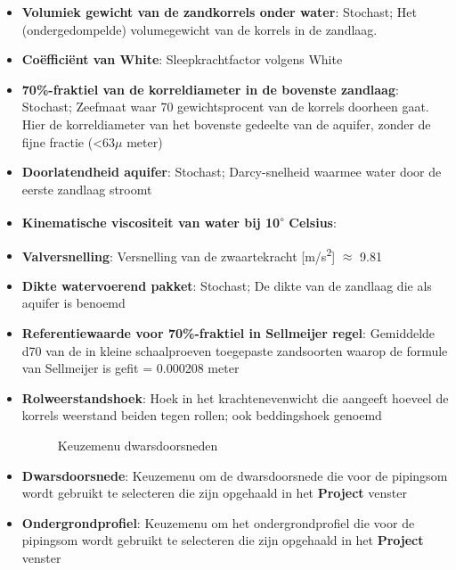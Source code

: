 \begin{enumerate}
\begin{itemize}
	\item \textbf{Volumiek gewicht van de zandkorrels onder water}: Stochast; Het (ondergedompelde) volumegewicht van de korrels in de zandlaag.
	\item \textbf{Co\"{e}ffici\"{e}nt van White}: Sleepkrachtfactor volgens White
	\item \textbf{70\%-fraktiel van de korreldiameter in de bovenste zandlaag}: Stochast; Zeefmaat waar 70 gewichtsprocent van de korrels doorheen gaat. Hier de korreldiameter van het bovenste gedeelte van de aquifer, zonder de fijne fractie (<63$\mu$ meter)
	\item \textbf{Doorlatendheid aquifer}: Stochast; Darcy-snelheid waarmee water door de eerste zandlaag stroomt
	\item \textbf{Kinematische viscositeit van water bij 10\textsuperscript{$\circ$} Celsius}: 
	\item \textbf{Valversnelling}: Versnelling van de zwaartekracht [m/s\textsuperscript{2}] $\approx$ 9.81
	\item \textbf{Dikte watervoerend pakket}: Stochast; De dikte van de zandlaag die als aquifer is benoemd
	\item \textbf{Referentiewaarde voor 70\%-fraktiel in Sellmeijer regel}: Gemiddelde d70 van de in kleine schaalproeven toegepaste zandsoorten waarop de formule van Sellmeijer is gefit = 0.000208 meter
	\item \textbf{Rolweerstandshoek}: Hoek in het krachtenevenwicht die aangeeft hoeveel de korrels weerstand beiden tegen rollen; ook beddingshoek genoemd
	\begin{figure} [H]
	\centering
	\caption{Keuzemenu dwarsdoorsneden}
	\label{fig:fig5.6}
\end{figure}
	\item \textbf{Dwarsdoorsnede}: Keuzemenu om de dwarsdoorsnede die voor de pipingsom wordt gebruikt te selecteren die zijn opgehaald in het \textbf{Project} venster
	\item \textbf{Ondergrondprofiel}: Keuzemenu om het ondergrondprofiel die voor de pipingsom wordt gebruikt te selecteren die zijn opgehaald in het \textbf{Project} venster
	\end{itemize}

\end{enumerate}


